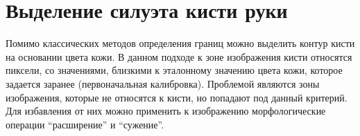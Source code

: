 \section{Выделение силуэта кисти руки}
\label{sec:Threholding}

Помимо классических методов определения границ можно выделить контур кисти на основании цвета кожи. В данном подходе к зоне изображения кисти относятся пиксели, со значениями, близкими к эталонному значению цвета кожи, которое задается заранее (первоначальная калибровка). Проблемой являются зоны изображения, которые не относятся к кисти, но попадают под данный критерий. Для избавления от них можно применить к изображению морфологические операции “расширение” и “сужение”.
